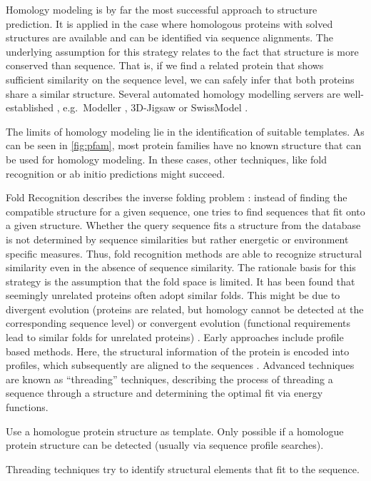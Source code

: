 \documentclass[12pt,a4paper,twoside]{book}
\begin{document}
Homology modeling is by far the most successful approach to structure
prediction. It is applied in the case where homologous proteins with
solved structures are available and can be identified via sequence
alignments. The underlying assumption for this strategy relates to the
fact that structure is more conserved than sequence. That is, if we find
a related protein that shows sufficient similarity on the sequence
level, we can safely infer that both proteins share a similar structure.
Several automated homology modelling servers are well-established ,
e.g.~Modeller \citep{Eswar2007}, 3D-Jigsaw \citep{Bates2001} or
SwissModel \citep{Arnold2006}.

The limits of homology modeling lie in the identification of suitable
templates. As can be seen in \autoref{fig:pfam}, most protein families
have no known structure that can be used for homology modeling. In these
cases, other techniques, like fold recognition or ab initio predictions
might succeed.

Fold Recognition describes the inverse folding problem
\citep{Bowie1993}: instead of finding the compatible structure for a
given sequence, one tries to find sequences that fit onto a given
structure. Whether the query sequence fits a structure from the database
is not determined by sequence similarities but rather energetic or
environment specific measures. Thus, fold recognition methods are able
to recognize structural similarity even in the absence of sequence
similarity. The rationale basis for this strategy is the assumption that
the fold space is limited. It has been found that seemingly unrelated
proteins often adopt similar folds. This might be due to divergent
evolution (proteins are related, but homology cannot be detected at the
corresponding sequence level) or convergent evolution (functional
requirements lead to similar folds for unrelated proteins)
\citep{Gu2009}. Early approaches include profile based methods. Here,
the structural information of the protein is encoded into profiles,
which subsequently are aligned to the sequences
\citep{Bowie1991,Fischer1996,Ouzounis1993}. Advanced techniques are
known as ``threading'' techniques, describing the process of threading a
sequence through a structure and determining the optimal fit via energy
functions. \citep{Jones1992,Jones1998,Lemer1995}

Use a homologue protein structure as template. Only possible if a
homologue protein structure can be detected (usually via sequence
profile searches).

Threading techniques try to identify structural elements that fit to the
sequence.
\end{document}
